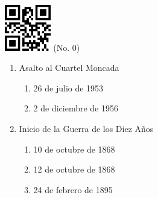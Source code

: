\documentclass[twocolumn]{article}
\title{}
\date{}
\begin{document}

\begin{center}
 \hspace{0.2cm}
 \includegraphics[width=2cm]{qrcode-0.png}
 \hspace{0.5cm}
 \Large{  (No. 0) }
\end{center}



\begin{enumerate}



  \item Asalto al Cuartel Moncada

  \begin{enumerate}
   
   \item 26 de julio de 1953
   
   \item 2 de diciembre de 1956
   
  \end{enumerate}



  \item Inicio de la Guerra de los Diez Años

  \begin{enumerate}
   
   \item 10 de octubre de 1868
   
   \item 12 de octubre de 1868
   
   \item 24 de febrero de 1895
   
  \end{enumerate}


\end{enumerate}


\end{document}
